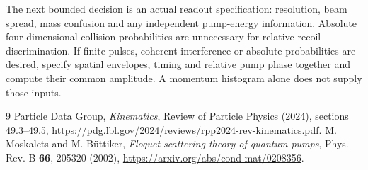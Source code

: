 \documentclass[11pt,a4paper]{article}
\begin{document}
The next bounded decision is an actual readout specification:
resolution, beam spread, mass confusion and any independent pump-energy
information. Absolute four-dimensional collision probabilities are
unnecessary for relative recoil discrimination. If finite pulses,
coherent interference or absolute probabilities are desired, specify
spatial envelopes, timing and relative pump phase together and compute
their common amplitude. A momentum histogram alone does not supply
those inputs.

\begin{thebibliography}{9}
 Particle Data Group, \emph{Kinematics}, Review of Particle
Physics (2024), sections 49.3--49.5,
\url{https://pdg.lbl.gov/2024/reviews/rpp2024-rev-kinematics.pdf}.
 M. Moskalets and M. B\"uttiker,
\emph{Floquet scattering theory of quantum pumps},
Phys. Rev. B \textbf{66}, 205320 (2002),
\url{https://arxiv.org/abs/cond-mat/0208356}.
\end{thebibliography}
\end{document}
